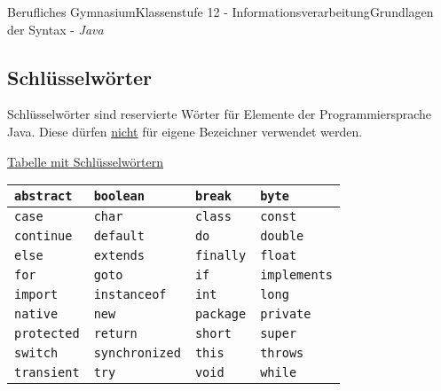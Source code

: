 \documentclass[11pt,oneside,openany,headings=optiontotoc,11pt,numbers=noenddot]{article}
\begin{document}
\begin{worksheet}{Berufliches Gymnasium}{Klassenstufe 12 - Informationsverarbeitung}{Grundlagen der Syntax - \textit{Java}}
		\subsection{Schlüsselwörter}
		Schlüsselwörter sind reservierte Wörter für Elemente der Programmiersprache Java. Diese dürfen \underline{nicht} für eigene Bezeichner verwendet werden.\\
		\par\noindent
		\underline{Tabelle mit Schlüsselwörtern}\\
		\par\noindent
		\begin{tabularx}{\textwidth}{|M|M|M|M|}
			\hline
			{\lstinline[style=JavaInputStyle]|abstract|} & {\lstinline[style=JavaInputStyle]|boolean|} & {\lstinline[style=JavaInputStyle]|break|} & {\lstinline[style=JavaInputStyle]|byte|}\\
			\hline
			{\lstinline[style=JavaInputStyle]|case|} & {\lstinline[style=JavaInputStyle]|char|} & {\lstinline[style=JavaInputStyle]|class|} & {\lstinline[style=JavaInputStyle]|const|}\\
			\hline
			{\lstinline[style=JavaInputStyle]|continue|} & {\lstinline[style=JavaInputStyle]|default|} & {\lstinline[style=JavaInputStyle]|do|} & {\lstinline[style=JavaInputStyle]|double|}\\
			\hline
			{\lstinline[style=JavaInputStyle]|else|} & {\lstinline[style=JavaInputStyle]|extends|} & {\lstinline[style=JavaInputStyle]|finally|} & {\lstinline[style=JavaInputStyle]|float|}\\
			\hline
			{\lstinline[style=JavaInputStyle]|for|} & {\lstinline[style=JavaInputStyle]|goto|} & {\lstinline[style=JavaInputStyle]|if|} & {\lstinline[style=JavaInputStyle]|implements|}\\
			\hline
			{\lstinline[style=JavaInputStyle]|import|} & {\lstinline[style=JavaInputStyle]|instanceof|} & {\lstinline[style=JavaInputStyle]|int|} & {\lstinline[style=JavaInputStyle]|long|}\\
			\hline
			{\lstinline[style=JavaInputStyle]|native|} & {\lstinline[style=JavaInputStyle]|new|} & {\lstinline[style=JavaInputStyle]|package|} & {\lstinline[style=JavaInputStyle]|private|}\\
			\hline
			{\lstinline[style=JavaInputStyle]|protected|} & {\lstinline[style=JavaInputStyle]|return|} & {\lstinline[style=JavaInputStyle]|short|} & {\lstinline[style=JavaInputStyle]|super|}\\
			\hline
			{\lstinline[style=JavaInputStyle]|switch|} & {\lstinline[style=JavaInputStyle]|synchronized|} & {\lstinline[style=JavaInputStyle]|this|} & {\lstinline[style=JavaInputStyle]|throws|}\\
			\hline
			{\lstinline[style=JavaInputStyle]|transient|} & {\lstinline[style=JavaInputStyle]|try|} & {\lstinline[style=JavaInputStyle]|void|} & {\lstinline[style=JavaInputStyle]|while|}\\
			\hline
		\end{tabularx}

\end{worksheet}
\end{document}
